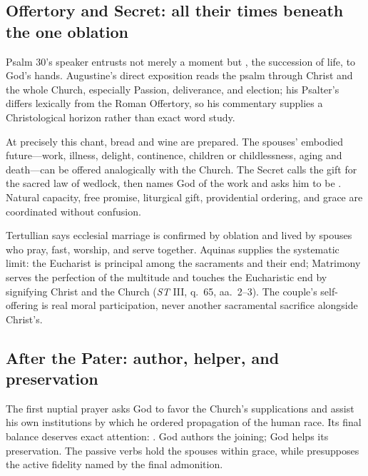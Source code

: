 \begin{deepstudy}
\sectionguard
\subsection*{Offertory and Secret: all their times beneath the one oblation\enspace{}}

Psalm 30's speaker entrusts not merely a moment but , the succession of life, to God's hands. Augustine's direct exposition reads the psalm through Christ and the whole Church, especially Passion, deliverance, and election; his Psalter's  differs lexically from the Roman Offertory, so his commentary supplies a Christological horizon rather than exact word study.

At precisely this chant, bread and wine are prepared. The spouses' embodied future---work, illness, delight, continence, children or childlessness, aging and death---can be offered analogically with the Church. The Secret calls the gift  for the sacred law of wedlock, then names God  of the work and asks him to be . Natural capacity, free promise, liturgical gift, providential ordering, and grace are coordinated without confusion.

Tertullian says ecclesial marriage is confirmed by oblation and lived by spouses who pray, fast, worship, and serve together. Aquinas supplies the systematic limit: the Eucharist is principal among the sacraments and their end; Matrimony serves the perfection of the multitude and touches the Eucharistic end by signifying Christ and the Church (\emph{ST} III, q.~65, aa.~2--3). The couple's self-offering is real moral participation, never another sacramental sacrifice alongside Christ's.

\sectionguard
\subsection*{After the Pater: author, helper, and preservation\enspace{}}

The first nuptial prayer asks God to favor the Church's supplications and assist his own institutions by which he ordered propagation of the human race. Its final balance deserves exact attention: . God authors the joining; God helps its preservation. The passive verbs hold the spouses within grace, while  presupposes the active fidelity named by the final admonition.


\end{deepstudy}

